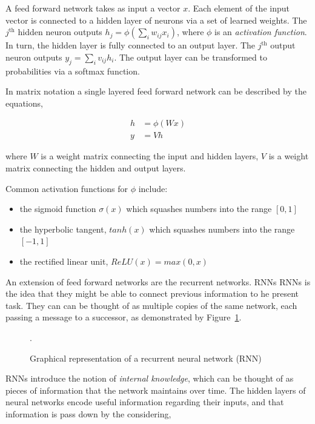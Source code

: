 A feed forward network takes as input a vector \(x\). Each element of the input
vector is connected to a hidden layer of neurons via a set of learned weights.
The \(j^{\text{th}}\) hidden neuron outputs \(h_j = \phi (\sum_{i} w_{ij}
x_{i})\), where \(\phi\) is an \textit{activation function}. In turn, the hidden
layer is fully connected to an output layer. The \(j^{\text{th}}\) output neuron
outputs \(y_{j} = \sum_{i} v_{ij} h_{i}\). The output layer can be transformed
to probabilities via a softmax function. 

In matrix notation a single layered feed forward network can be described by
the equations,

\begin{align}\label{eq:neural_network_equations}
h & = \phi(Wx) \\ \label{eq:neural_network_equations_two}
y & = Vh
\end{align}

where \(W\) is a weight matrix connecting the input and hidden layers, \(V\) is
a weight matrix connecting the hidden and output layers.

Common activation functions for \(\phi\) include:

\begin{itemize}
    \item the sigmoid function \(\sigma(x)\) which squashes numbers into the range \([0, 1]\)
    \item the hyperbolic tangent, \(tanh(x)\) which squashes numbers into the range \([-1, 1]\)
    \item the rectified linear unit, \(ReLU(x)=max(0,x)\)
\end{itemize}

An extension of feed forward networks are the recurrent networks. RNNs RNNs is
the idea that they might be able to connect previous information to he present
task. They can can be thought of as multiple copies of the same network, each
passing a message to a successor, as demonstrated by Figure~\ref{fig:rnn}.

\begin{figure}[!htbp]
    \centering
    
    \caption{Graphical representation of a recurrent neural network (RNN)}.\label{fig:rnn}
\end{figure}

RNNs introduce the notion of \textit{internal knowledge}, which can be thought of
as pieces of information that the network maintains over time. The hidden layers
of neural networks encode useful information regarding their inputs, and that
information is pass down by the considering,

